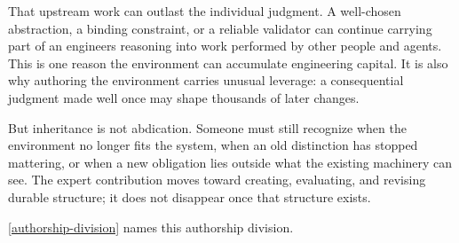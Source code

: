 That upstream work can outlast the individual judgment. A well-chosen abstraction, a binding constraint, or a reliable validator can continue carrying part of an engineer\textquotesingle s reasoning into work performed by other people and agents. This is one reason the environment can accumulate engineering capital. It is also why authoring the environment carries unusual leverage: a consequential judgment made well once may shape thousands of later changes.


But inheritance is not abdication. Someone must still recognize when the environment no longer fits the system, when an old distinction has stopped mattering, or when a new obligation lies outside what the existing machinery can see. The expert contribution moves toward creating, evaluating, and revising durable structure; it does not disappear once that structure exists.

\autoref{authorship-division} names this authorship division.

